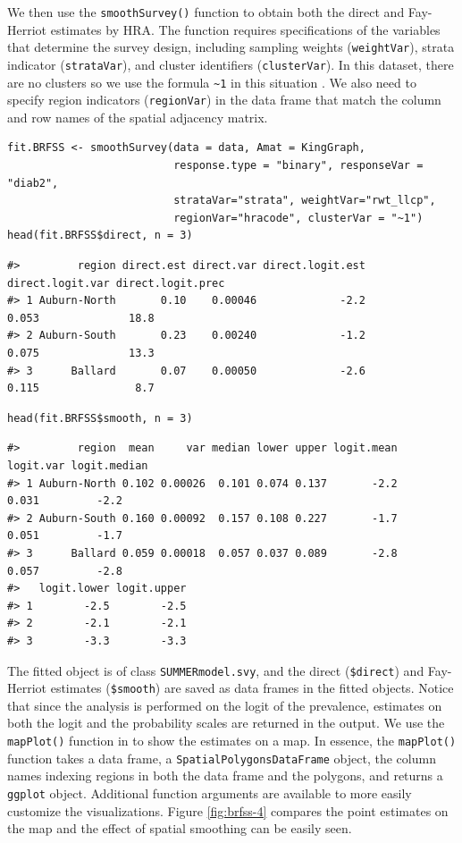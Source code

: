 We then use the \texttt{smoothSurvey()} function to obtain both the direct and Fay-Herriot estimates by HRA. The function requires specifications of the variables that determine the survey design, including sampling weights (\texttt{weightVar}), strata indicator (\texttt{strataVar}), and cluster identifiers (\texttt{clusterVar}). In this dataset, there are no clusters so we use the formula \texttt{\textasciitilde{}1} in this situation \citep{lumley2004analysis}. We also need to specify region indicators (\texttt{regionVar}) in the data frame that match the column and row names of the spatial adjacency matrix.

\begin{verbatim}
fit.BRFSS <- smoothSurvey(data = data, Amat = KingGraph, 
                          response.type = "binary", responseVar = "diab2", 
                          strataVar="strata", weightVar="rwt_llcp", 
                          regionVar="hracode", clusterVar = "~1")
head(fit.BRFSS$direct, n = 3)
\end{verbatim}

\begin{verbatim}
#>         region direct.est direct.var direct.logit.est direct.logit.var direct.logit.prec
#> 1 Auburn-North       0.10    0.00046             -2.2            0.053              18.8
#> 2 Auburn-South       0.23    0.00240             -1.2            0.075              13.3
#> 3      Ballard       0.07    0.00050             -2.6            0.115               8.7
\end{verbatim}

\begin{verbatim}
head(fit.BRFSS$smooth, n = 3)
\end{verbatim}

\begin{verbatim}
#>         region  mean     var median lower upper logit.mean logit.var logit.median
#> 1 Auburn-North 0.102 0.00026  0.101 0.074 0.137       -2.2     0.031         -2.2
#> 2 Auburn-South 0.160 0.00092  0.157 0.108 0.227       -1.7     0.051         -1.7
#> 3      Ballard 0.059 0.00018  0.057 0.037 0.089       -2.8     0.057         -2.8
#>   logit.lower logit.upper
#> 1        -2.5        -2.5
#> 2        -2.1        -2.1
#> 3        -3.3        -3.3
\end{verbatim}

The fitted object is of class \texttt{SUMMERmodel.svy}, and the direct (\texttt{\$direct}) and Fay-Herriot estimates (\texttt{\$smooth}) are saved as data frames in the fitted objects. Notice that since the analysis is performed on the logit of the prevalence, estimates on both the logit and the probability scales are returned in the output. We use the \texttt{mapPlot()} function in  to show the estimates on a map. In essence, the \texttt{mapPlot()} function takes a data frame, a \texttt{SpatialPolygonsDataFrame} object, the column names indexing regions in both the data frame and the polygons, and returns a \texttt{ggplot} object. Additional function arguments are available to more easily customize the visualizations. Figure \ref{fig:brfss-4} compares the point estimates on the map and the effect of spatial smoothing can be easily seen.

